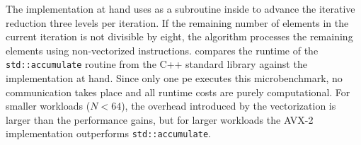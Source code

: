 The implementation at hand uses  as a subroutine inside  to advance the iterative reduction three levels per iteration.
If the remaining number of elements in the current iteration is not divisible by eight, the algorithm processes the remaining elements using non-vectorized instructions.
 compares the runtime of the \texttt{std::accumulate} routine from the C++ standard library against the implementation at hand.
Since only one \gls{pe} executes this microbenchmark, no communication takes place and all runtime costs are purely computational.
For smaller workloads ($N < 64$), the overhead introduced by the vectorization is larger than the performance gains, but for larger workloads the AVX-2 implementation outperforms \texttt{std::accumulate}.
